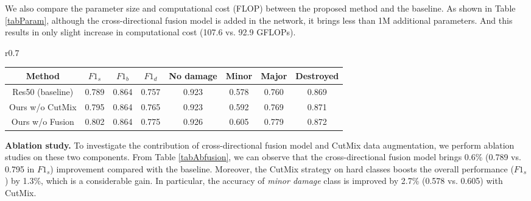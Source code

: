 \documentclass{article}
\begin{document}
We also compare the parameter size and computational cost (FLOP) between the proposed method and the baseline. As shown in Table \ref{tabParam}, although the cross-directional fusion model is added in the network, it brings less than 1M additional parameters. And this results in only slight increase in computational cost (107.6 vs. 92.9 GFLOPs). 
\begin{wraptable}{r}{0.7\textwidth}
\vspace{-\intextsep}
\footnotesize
  \caption{Ablation study on cross-directional fusion and CutMix.}
  \vspace{-0.3cm}
  \begin{center}
  \setlength\tabcolsep{2.0pt} 
  \renewcommand{\arraystretch}{0.7}\begin{tabular}{cccccccc}
    \toprule
    \textbf{Method}     & $F1_s$    & $F1_b$ & $F1_d$ & No damage & Minor & Major & Destroyed \\
    \midrule
     Res50 (baseline) & 0.789 & 0.864 &	0.757 &	0.923 &	0.578 &	0.760 &	0.869 \\
     Ours w/o CutMix   & 0.795  &  0.864    & 0.765  & 0.923 & 0.592 & 0.769 &0.871\\
     Ours w/o Fusion   & 0.802  &  0.864    & 0.775  & 0.926 & 0.605 & 0.779 & 0.872 \\
    \bottomrule
  \end{tabular}
  \vspace{-0.3cm}
  \end{center}
\label{tabAbfusion}
\end{wraptable}

\textbf{Ablation study.}
To investigate the contribution of cross-directional fusion model and CutMix data augmentation, we perform ablation studies on these two components. From Table \ref{tabAbfusion}, we can observe that the cross-directional fusion model brings 0.6\% (0.789 vs. 0.795 in $F1_s$) improvement compared with the baseline. Moreover, the CutMix strategy on hard classes boosts the overall performance ($F1_s$) by 1.3\%, which is a considerable gain. In particular, the accuracy of \textit{minor damage} class is improved by 2.7\% (0.578 vs. 0.605) with CutMix. 
\end{document}
